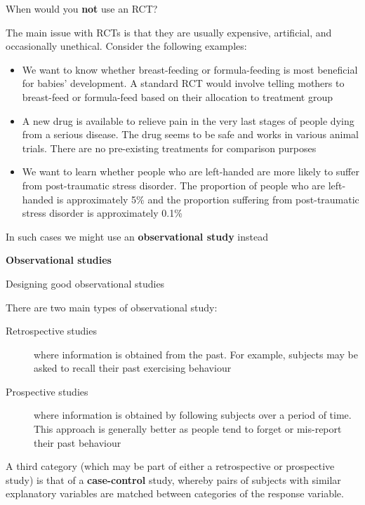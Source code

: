 \documentclass[12pt,xcolor=dvipsnames,handout,mathserif,aspectratio=169]{beamer}
\newcommand{\bbl}[1]{{\color{NavyBlue} \textbf{#1}}}
\newcommand{\bre}[1]{{\color{red} \textbf{#1}}}
\newcommand{\bgr}[1]{{\color{PineGreen} \textbf{#1}}}
\begin{document}
\begin{frame}{ When would you \bre{not} use an RCT? }

The main issue with RCTs is that they are usually expensive, artificial, and occasionally unethical. Consider the following examples:
\begin{itemize}
\item We want to know whether breast-feeding or formula-feeding is most beneficial for babies' development. A standard RCT would involve telling mothers to breast-feed or formula-feed based on their allocation to treatment group
\pause
\item A new drug is available to relieve pain in the very last stages of people dying from a serious disease. The drug seems to be safe and works in various animal trials. There are no pre-existing treatments for comparison purposes
\pause
\item We want to learn whether people who are left-handed are more likely to suffer from post-traumatic stress disorder. The proportion of people who are left-handed is approximately 5\% and the proportion suffering from post-traumatic stress disorder is approximately 0.1\%
\end{itemize}
\pause
In such cases we might use an \bgr{observational study} instead

\end{frame}

\begin{frame}[fragile]{}
\bbl{\Huge Observational studies}\\ 
\vspace{0.5cm}
\end{frame}

\begin{frame}{Designing good observational studies }

There are two main types of observational study:
\begin{description}
\item[Retrospective studies] where information is obtained from the past. For example, subjects may be asked to recall their past exercising behaviour
\pause
\item[Prospective studies] where information is obtained by following subjects over a period of time. This approach is generally better as people tend to forget or mis-report their past behaviour
\end{description}
\pause
A third category (which may be part of either a retrospective or prospective study) is that of a \bbl{case-control} study, whereby pairs of subjects with similar explanatory variables are matched between categories of the response variable. 

\end{frame}
\end{document}
